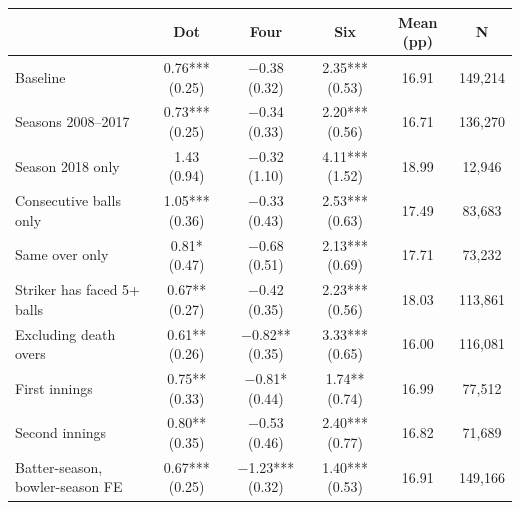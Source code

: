 \begin{tabular}{lccccc}
\toprule
 & Dot & Four & Six & Mean (pp) & N \\
\midrule
Baseline & 0.76*** (0.25) & $-$0.38 (0.32) & 2.35*** (0.53) & 16.91 & 149,214 \\
Seasons 2008--2017 & 0.73*** (0.25) & $-$0.34 (0.33) & 2.20*** (0.56) & 16.71 & 136,270 \\
Season 2018 only & 1.43 (0.94) & $-$0.32 (1.10) & 4.11*** (1.52) & 18.99 & 12,946 \\
Consecutive balls only & 1.05*** (0.36) & $-$0.33 (0.43) & 2.53*** (0.63) & 17.49 & 83,683 \\
Same over only & 0.81* (0.47) & $-$0.68 (0.51) & 2.13*** (0.69) & 17.71 & 73,232 \\
Striker has faced 5+ balls & 0.67** (0.27) & $-$0.42 (0.35) & 2.23*** (0.56) & 18.03 & 113,861 \\
Excluding death overs & 0.61** (0.26) & $-$0.82** (0.35) & 3.33*** (0.65) & 16.00 & 116,081 \\
First innings & 0.75** (0.33) & $-$0.81* (0.44) & 1.74** (0.74) & 16.99 & 77,512 \\
Second innings & 0.80** (0.35) & $-$0.53 (0.46) & 2.40*** (0.77) & 16.82 & 71,689 \\
Batter-season, bowler-season FE & 0.67*** (0.25) & $-$1.23*** (0.32) & 1.40*** (0.53) & 16.91 & 149,166 \\
\bottomrule
\end{tabular}
